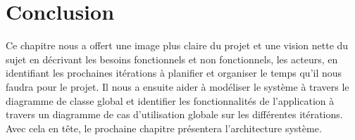 \documentclass[../main.tex]{subfiles}
\begin{document}
\section{Conclusion}
Ce chapitre nous a offert une image plus claire du projet et une vision nette du sujet en décrivant les besoins fonctionnels et non fonctionnels, les acteurs, en identifiant les prochaines itérations à planifier et organiser le temps qu'il nous faudra pour le projet. Il nous a ensuite aider à modéliser le système à travers le diagramme de classe global et identifier les fonctionnalités de l'application à travers un diagramme de cas d'utilisation globale sur les différentes itérations. Avec cela en tête, le prochaine chapitre présentera l'architecture système. 
\end{document}
